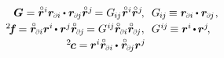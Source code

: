 \nopagebreak\vspace{-0.1em}
\begin{equation*}\label{componentsofdeformationtensors}
\begin{array}{r@{\hspace{.66em}}l}
\bm{G} = \initiallocationvector^i \currentlocationvector_\differentialindex{i} \hspace{-0.1ex} \dotp \currentlocationvector_\differentialindex{\hspace{-0.1ex}j} \initiallocationvector^j \hspace{-0.25ex}
= G_{\hspace{-0.15ex}i\hspace{-0.1ex}j} \hspace{.1ex} \initiallocationvector^i \initiallocationvector^j
\hspace{-0.3ex} , &
G_{\hspace{-0.15ex}i\hspace{-0.1ex}j} \hspace{-0.2ex} \equiv
\currentlocationvector_\differentialindex{i} \hspace{-0.1ex} \dotp \currentlocationvector_\differentialindex{\hspace{-0.1ex}j}
\hspace{.1ex} ,
\\[.25em]
%
{{^2}\hspace{-0.4ex}\bm{f}} \hspace{-0.2ex} = \initiallocationvector_\differentialindex{i} \currentlocationvector^{i} \hspace{-0.2ex} \dotp \currentlocationvector^j \initiallocationvector_\differentialindex{\hspace{-0.1ex}j} \hspace{-0.2ex}
= G^{\hspace{.1ex}i\hspace{-0.1ex}j} \initiallocationvector_\differentialindex{i} \initiallocationvector_\differentialindex{\hspace{-0.1ex}j}
, &
G^{\hspace{.1ex}i\hspace{-0.1ex}j} \hspace{-0.2ex} \equiv
\currentlocationvector^{i} \hspace{-0.2ex} \dotp \hspace{-0.15ex} \currentlocationvector^j
\hspace{-0.3ex} ,
\\[.25em]
%
{{^2}\hspace{-0.2ex}\bm{c}} = \hspace{-0.1ex} \currentlocationvector^{i} \initiallocationvector_\differentialindex{i} \hspace{-0.1ex} \dotp \hspace{.1ex} \initiallocationvector_\differentialindex{\hspace{-0.1ex}j} \currentlocationvector^{j} \hspace{-0.25ex}

\end{array}
\end{equation*}
